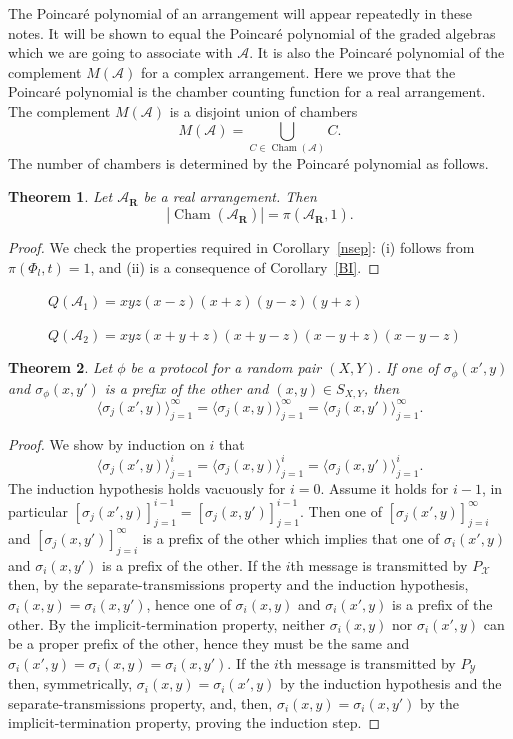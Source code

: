 \documentclass{article}
\newtheorem{thm}{Theorem}[section]
\theoremstyle{definition}
\theoremstyle{remark}
\newcommand{\A}{\mathcal{A}}
\newcommand{\st}{\sigma}
\newcommand{\XcY}{{(X,Y)}}
\newcommand{\SXY}{{S_{X,Y}}}
\newcommand{\PY}{{P_{\mathcal{Y}}}}
\newcommand{\X}{\mathcal{X}}
\DeclareMathOperator{\Cham}{Cham}
\newcommand{\envert}[1]{\left\lvert#1\right\rvert}
\let\abs=\envert
\begin{document}
The Poincar\'e polynomial of an arrangement
will appear repeatedly
in these notes. It will be shown to equal the
Poincar\'e polynomial
of the graded algebras which we are going to
associate with $\A$. It is also the Poincar\'e
polynomial of the complement $M(\A)$ for a
complex arrangement. Here we prove
that the Poincar\'e polynomial is the chamber
counting function for a real arrangement. The
complement $M(\A)$ is a disjoint union of chambers
\[M(\A) = \bigcup_{C \in \Cham(\A)} C.\]
The number
of chambers is determined by the Poincar\'e
polynomial as follows.

\begin{thm}\label{th-realarr}
Let $\A_{\mathbf{R}}$ be a real arrangement. Then
\[ \abs{\Cham(\A_{\mathbf{R}})} = \pi (\A_{\mathbf{R}},1). \]
\end{thm}

\begin{proof}
We check the properties required in Corollary~\ref{nsep}:
(i) follows from $\pi (\Phi_{ l},t) = 1$, and (ii) is a
consequence of Corollary~\ref{BI}.
\end{proof}

\begin{figure}
\vspace{5cm}
\caption[]{$Q(\A_{1}) = xyz(x-z)(x+z)(y-z)(y+z)$}
\end{figure}

\begin{figure}
\vspace{5cm}
\caption[]{$Q(\A_{2})= xyz(x+y+z)(x+y-z)(x-y+z)(x-y-z)$}
\end{figure}


\begin{thm}
\label{T_first_the_int}
Let $\phi$ be a protocol for a random pair $\XcY$.
If one of $\st_\phi(x',y)$ and $\st_\phi(x,y')$ is a prefix of the other
and $(x,y)\in\SXY$, then
\[
\langle \st_j(x',y)\rangle_{j=1}^\infty
=\langle \st_j(x,y)\rangle_{j=1}^\infty
=\langle \st_j(x,y')\rangle_{j=1}^\infty .
\]
\end{thm}
\begin{proof}
We show by induction on $i$ that
\[
\langle \st_j(x',y)\rangle_{j=1}^i
=\langle \st_j(x,y)\rangle_{j=1}^i
=\langle \st_j(x,y')\rangle_{j=1}^i.
\]
The induction hypothesis holds vacuously for $i=0$. Assume it holds for
$i-1$, in particular
$[\st_j(x',y)]_{j=1}^{i-1}=[\st_j(x,y')]_{j=1}^{i-1}$. Then one of
$[\st_j(x',y)]_{j=i}^{\infty}$ and $[\st_j(x,y')]_{j=i}^{\infty}$ is a
prefix of the other which implies that one of $\st_i(x',y)$ and
$\st_i(x,y')$ is a prefix of the other. If the $i$th message is
transmitted by $P_{\X}$ then, by the separate-transmissions property and
the induction hypothesis, $\st_i(x,y)=\st_i(x,y')$, hence one of
$\st_i(x,y)$ and $\st_i(x',y)$ is a prefix of the other. By the
implicit-termination property, neither $\st_i(x,y)$ nor $\st_i(x',y)$
can be a proper prefix of the other, hence they must be the same and
$\st_i(x',y)=\st_i(x,y)=\st_i(x,y')$. If the $i$th message is
transmitted by $\PY$ then, symmetrically, $\st_i(x,y)=\st_i(x',y)$ by
the induction hypothesis and the separate-transmissions property, and,
then, $\st_i(x,y)=\st_i(x,y')$ by the implicit-termination property,
proving the induction step.
\end{proof}
\end{document}
